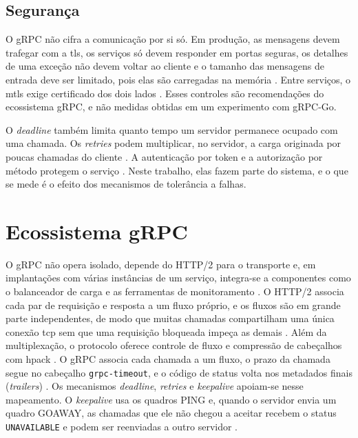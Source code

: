 \subsection{Segurança}\label{sec:seguranca-grpc}

O gRPC não cifra a comunicação por si só. Em produção, as mensagens devem trafegar com a \gls{tls},
os serviços só devem responder em portas seguras, os detalhes de uma exceção não devem voltar ao
cliente e o tamanho das mensagens de entrada deve ser limitado, pois elas são carregadas na memória
\cite{gRPC-Security:2026}. Entre serviços, o \gls{mtls} exige certificado dos dois lados
\cite{OWASP-gRPC-Security:2026}. Esses controles são recomendações do ecossistema gRPC, e não
medidas obtidas em um experimento com gRPC-Go.

O \textit{deadline} também limita quanto tempo um servidor permanece ocupado com uma chamada. Os
\textit{retries} podem multiplicar, no servidor, a carga originada por poucas chamadas do cliente
\cite{OWASP-gRPC-Security:2026,gRFC-A6:2024}. A autenticação por token e a autorização por método
protegem o serviço \cite{OWASP-gRPC-Security:2026}. Neste trabalho, elas fazem parte do sistema, e o
que se mede é o efeito dos mecanismos de tolerância a falhas.

\section{Ecossistema gRPC}\label{sec:ecossistema-grpc}

O gRPC não opera isolado, depende do HTTP/2 para o transporte e, em implantações com várias
instâncias de um serviço, integra-se a componentes como o balanceador de carga e as ferramentas de
monitoramento \cite{gRPC-LoadBalancing:2017}. O HTTP/2 associa cada par de requisição e resposta a
um fluxo próprio, e os fluxos são em grande parte independentes, de modo que muitas chamadas
compartilham uma única conexão \gls{tcp} sem que uma requisição bloqueada impeça as demais
\cite{RFC9113:2022}. Além da multiplexação, o protocolo oferece controle de fluxo e compressão de
cabeçalhos com \gls{hpack} \cite{RFC9113:2022, RFC7541:2015}. O gRPC associa cada chamada a um
fluxo, o prazo da chamada segue no cabeçalho \texttt{grpc-timeout}, e o código de status volta nos
metadados finais (\textit{trailers}) \cite{gRPC-HTTP2:2026}. Os mecanismos \textit{deadline},
\textit{retries} e \textit{keepalive} apoiam-se nesse mapeamento. O \textit{keepalive} usa os
quadros PING e, quando o servidor envia um quadro GOAWAY, as chamadas que ele não chegou a aceitar
recebem o status \texttt{UNAVAILABLE} e podem ser reenviadas a outro servidor \cite{gRPC-HTTP2:2026}.

